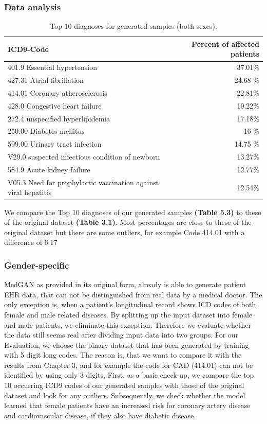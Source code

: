\documentclass[11pt, a4paper]{book}
\begin{document}
\subsubsection{Data analysis}

\begin{table}
\begin{tabular}{l|r}
\textbf{ICD9-Code} & \textbf{Percent of affected patients}\\
\hline
401.9  Essential hypertension & 37.01\%\\
427.31 Atrial fibrillation & 24.68 \%\\
414.01 Coronary atherosclerosis & 22.81\%\\
428.0 Congestive heart failure & 19.22\%\\
272.4 unspecified hyperlipidemia & 17.18\%\\
250.00 Diabetes mellitus & 16 \%\\
599.00 Urinary tract infection & 14.75 \%\\
V29.0 suspected infectious condition of newborn & 13.27\%\\
584.9 Acute kidney failure & 12.77\%\\
V05.3 Need for prophylactic vaccination against viral hepatitis & 12.54\%\\
\end{tabular}
\caption{\label{tab:top10-icd-mixed}Top 10 diagnoses for generated samples (both sexes).}
\end{table}

We compare the Top 10 diagnoses of our generated samples \textbf{(Table 5.3)} to these of the original dataset \textbf{(Table 3.1)}. Most percentages are close to these of the original dataset but there are some outliers, for example Code 414.01 with a difference of 6.17%

\subsubsection{Gender-specific}
MedGAN as provided in its original form, already is able to generate patient EHR data, that can not be distinguished from real data by a medical doctor. The only exception is, when a patient's longitudinal record shows ICD codes of both, female and male related diseases.  \cite{Choi2017}
By splitting up the input dataset into female and male patients, we eliminate this exception. Therefore we evaluate whether the data still seems real after dividing input data into two groups. For our Evaluation, we choose the binary dataset that has been generated by training with 5 digit long codes. The reason is, that we want to compare it with the results from Chapter 3, and for example the code for CAD (414.01) can not be identified by using only 3 digits,
First, as a basic check-up, we compare the top 10 occurring ICD9 codes of our generated samples with those of the original dataset and look for any outliers. Subsequently, we check whether the model learned that female patients have an increased risk for coronary artery disease and cardiovascular disease, if they also have diabetic disease. 
\end{document}
